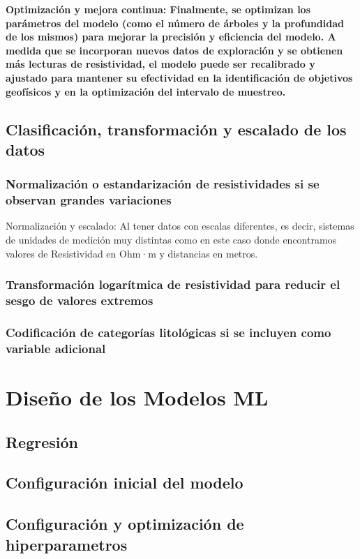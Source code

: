 \textbf{Optimización y mejora continua: Finalmente, se optimizan los parámetros del modelo (como el número de árboles y la profundidad de los mismos) para mejorar la precisión y eficiencia del modelo. A medida que se incorporan nuevos datos de exploración y se obtienen más lecturas de resistividad, el modelo puede ser recalibrado y ajustado para mantener su efectividad en la identificación de objetivos geofísicos y en la optimización del intervalo de muestreo.}


	\subsection{Clasificación, transformación y escalado de los datos}
	
		\subsubsection{Normalización o estandarización de resistividades si se observan grandes variaciones}
		
		Normalización y escalado: Al tener datos con escalas diferentes, es decir, sistemas de unidades de medición muy distintas como en este caso donde encontramos valores de Resistividad en Ohm·m y distancias en metros.
		 
		\subsubsection{Transformación logarítmica de resistividad para reducir el sesgo de valores extremos}
		\subsubsection{Codificación de categorías litológicas si se incluyen como variable adicional}

\section{Diseño de los Modelos ML}
	\subsection{Regresión}
	\subsection{Configuración inicial del modelo}
	\subsection{Configuración y optimización de hiperparametros}

